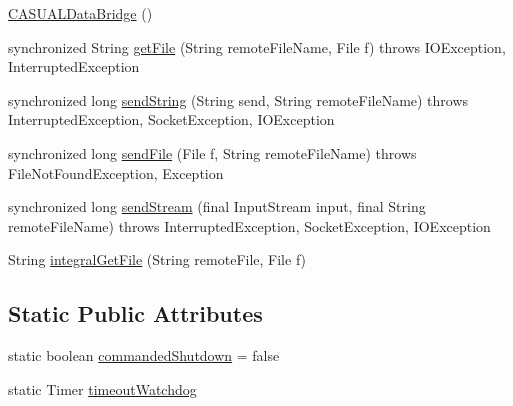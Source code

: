 \begin{DoxyCompactItemize}
\item 
\hyperlink{class_c_a_s_u_a_l_1_1communicationstools_1_1adb_1_1busybox_1_1_c_a_s_u_a_l_data_bridge_ad72d94b5e82945aeb28b4dad758de255}{C\-A\-S\-U\-A\-L\-Data\-Bridge} ()
\item 
synchronized String \hyperlink{class_c_a_s_u_a_l_1_1communicationstools_1_1adb_1_1busybox_1_1_c_a_s_u_a_l_data_bridge_a3c66acf4324f7aedad0a48b2ec87134b}{get\-File} (String remote\-File\-Name, File f)  throws I\-O\-Exception, Interrupted\-Exception 
\item 
synchronized long \hyperlink{class_c_a_s_u_a_l_1_1communicationstools_1_1adb_1_1busybox_1_1_c_a_s_u_a_l_data_bridge_ac3e718541063c8a8430b1bd37ab7233a}{send\-String} (String send, String remote\-File\-Name)  throws Interrupted\-Exception, Socket\-Exception, I\-O\-Exception 
\item 
synchronized long \hyperlink{class_c_a_s_u_a_l_1_1communicationstools_1_1adb_1_1busybox_1_1_c_a_s_u_a_l_data_bridge_aeb4a7a2d55e7f6810d16e1b1a9481904}{send\-File} (File f, String remote\-File\-Name)  throws File\-Not\-Found\-Exception, Exception 
\item 
synchronized long \hyperlink{class_c_a_s_u_a_l_1_1communicationstools_1_1adb_1_1busybox_1_1_c_a_s_u_a_l_data_bridge_a584e36b4ba305e615ad4d08550d0900d}{send\-Stream} (final Input\-Stream input, final String remote\-File\-Name)  throws Interrupted\-Exception, Socket\-Exception, I\-O\-Exception 
\item 
String \hyperlink{class_c_a_s_u_a_l_1_1communicationstools_1_1adb_1_1busybox_1_1_c_a_s_u_a_l_data_bridge_acb739d0cb44821136e9bb0a1f75f9414}{integral\-Get\-File} (String remote\-File, File f)
\end{DoxyCompactItemize}
\subsection*{Static Public Attributes}
\begin{DoxyCompactItemize}
\item 
static boolean \hyperlink{class_c_a_s_u_a_l_1_1communicationstools_1_1adb_1_1busybox_1_1_c_a_s_u_a_l_data_bridge_a1259937d2172aff609a4249b703a38ad}{commanded\-Shutdown} = false
\item 
static Timer \hyperlink{class_c_a_s_u_a_l_1_1communicationstools_1_1adb_1_1busybox_1_1_c_a_s_u_a_l_data_bridge_a0ad6dc9bf285c132d759fe4999dba4e8}{timeout\-Watchdog}
\end{DoxyCompactItemize}


